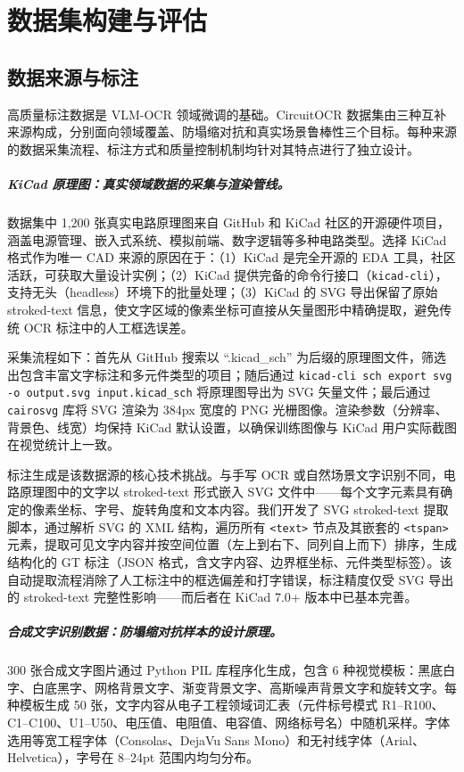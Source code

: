 \begin{figure}[h]
\centering
\end{figure}


\section{数据集构建与评估}

\subsection{数据来源与标注}

高质量标注数据是 VLM-OCR 领域微调的基础。CircuitOCR 数据集由三种互补来源构成，分别面向领域覆盖、防塌缩对抗和真实场景鲁棒性三个目标。每种来源的数据采集流程、标注方式和质量控制机制均针对其特点进行了独立设计。

\subparagraph{KiCad 原理图：真实领域数据的采集与渲染管线。}
数据集中 1,200 张真实电路原理图来自 GitHub 和 KiCad 社区的开源硬件项目，涵盖电源管理、嵌入式系统、模拟前端、数字逻辑等多种电路类型。选择 KiCad 格式作为唯一 CAD 来源的原因在于：（1）KiCad 是完全开源的 EDA 工具，社区活跃，可获取大量设计实例；（2）KiCad 提供完备的命令行接口（\texttt{kicad-cli}），支持无头（headless）环境下的批量处理；（3）KiCad 的 SVG 导出保留了原始 stroked-text 信息，使文字区域的像素坐标可直接从矢量图形中精确提取，避免传统 OCR 标注中的人工框选误差。

采集流程如下：首先从 GitHub 搜索以 ``.kicad\_sch'' 为后缀的原理图文件，筛选出包含丰富文字标注和多元件类型的项目；随后通过 \texttt{kicad-cli sch export svg -o output.svg input.kicad\_sch} 将原理图导出为 SVG 矢量文件；最后通过 \texttt{cairosvg} 库将 SVG 渲染为 384px 宽度的 PNG 光栅图像。渲染参数（分辨率、背景色、线宽）均保持 KiCad 默认设置，以确保训练图像与 KiCad 用户实际截图在视觉统计上一致。

标注生成是该数据源的核心技术挑战。与手写 OCR 或自然场景文字识别不同，电路原理图中的文字以 stroked-text 形式嵌入 SVG 文件中——每个文字元素具有确定的像素坐标、字号、旋转角度和文本内容。我们开发了 SVG stroked-text 提取脚本，通过解析 SVG 的 XML 结构，遍历所有 \texttt{<text>} 节点及其嵌套的 \texttt{<tspan>} 元素，提取可见文字内容并按空间位置（左上到右下、同列自上而下）排序，生成结构化的 GT 标注（JSON 格式，含文字内容、边界框坐标、元件类型标签）。该自动提取流程消除了人工标注中的框选偏差和打字错误，标注精度仅受 SVG 导出的 stroked-text 完整性影响——而后者在 KiCad 7.0+ 版本中已基本完善。

\subparagraph{合成文字识别数据：防塌缩对抗样本的设计原理。}
300 张合成文字图片通过 Python PIL 库程序化生成，包含 6 种视觉模板：黑底白字、白底黑字、网格背景文字、渐变背景文字、高斯噪声背景文字和旋转文字。每种模板生成 50 张，文字内容从电子工程领域词汇表（元件标号模式 R1--R100、C1--C100、U1--U50、电压值、电阻值、电容值、网络标号名）中随机采样。字体选用等宽工程字体（Consolas、DejaVu Sans Mono）和无衬线字体（Arial、Helvetica），字号在 8--24pt 范围内均匀分布。

